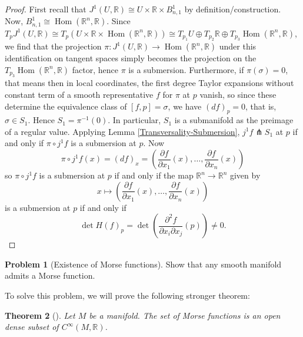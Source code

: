 \documentclass[reqno]{amsart}
\newtheorem{theorem}{Theorem}[section]
\theoremstyle{definition}
\newtheorem{problem}[theorem]{Problem}
\theoremstyle{remark}
\DeclareMathOperator{\Hom}{Hom}
\begin{document}
 \begin{proof}
     First recall that
     $J^{1}(U,\mathbb{R}) \cong
     U \times \mathbb{R} \times B_{n,1}^{1}$ by
     definition/construction. Now,
     $B_{n,1}^{1} \cong
     \Hom \left( \mathbb{R}^{n},\mathbb{R} \right) $.
     Since
     $T_p J^{1}(U,\mathbb{R}) \cong
     T_{p} \left( U \times \mathbb{R} \times 
     \Hom \left( \mathbb{R}^{n},\mathbb{R} \right) \right) 
     \cong T_{p_1}U \oplus
     T_{p_2} \mathbb{R} \oplus
     T_{p_3} \Hom\left( \mathbb{R}^{n},\mathbb{R} \right) $,
     we find that the projection
     $\pi \colon J^{1}\left( U,\mathbb{R} \right) 
     \to \Hom \left( \mathbb{R}^{n},\mathbb{R} \right) $ 
     under this identification on tangent spaces
     simply becomes the projection on the
     $T_{p_3}\Hom \left( \mathbb{R}^{n},\mathbb{R} \right) $ 
     factor, hence $\pi$ is a submersion.
     Furthermore,
     if $\pi (\sigma) = 0$, that means then
     in local coordinates, the first degree
     Taylor expansions without constant term
     of a smooth representative  $f$ for $\pi$ at
     $p$ vanish, so since these determine
     the equivalence class of $\left[ f,p \right] = 
     \sigma$, we
     have  $(df)_p = 0$, that is, $\sigma
     \in S_1$.
     Hence $S_1 = \pi^{-1}(0)$. In particular,
     $S_1$ is a submanifold as the preimage of a
     regular value.
     Applying Lemma \ref{Transversality-Submersion},
     $j^{1}f \pitchfork S_1$ at $p$ if and only if
     $\pi \circ j^{1} f$ is a submersion at $p$.
     Now \[
     \pi \circ j^{1} f(x) = 
     \left( df \right)_x 
     =
     \left( \frac{\partial f}{\partial x_1}(x),
     \ldots, \frac{\partial f}{\partial x_n}(x)\right)
     \] 
     so $\pi \circ j^{1}f$ is a submersion at $p$ if
     and only if
     the map
     $\mathbb{R}^{n} \to \mathbb{R}^{n}$ 
     given by
     \[
     x\mapsto \left( \frac{\partial f}{\partial x_1}(x),
     \ldots, \frac{\partial f}{\partial x_n}(x)\right) 
     \] is a submersion at $p$ if and only if
     \[
     \det H (f)_p = \det \left( \frac{\partial^2 f}{
     \partial x_i \partial x_j} (p) \right) \neq 0.
     \] 
 \end{proof}


 \begin{problem}[Existence of Morse functions]
     Show that any smooth manifold admits a Morse function.
 \end{problem}


     To solve this problem, we will prove the following
     stronger theorem:
     \begin{theorem}[]
         Let $M$ be a manifold. The set of Morse
         functions is an open dense subset of
         $C^{\infty}(M,\mathbb{R})$.
     \end{theorem}
\end{document}
